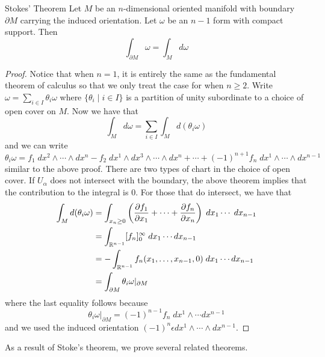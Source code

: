 \documentclass[a4paper]{article}
\begin{document}
\begin{thm}{Stokes' Theorem}{} Let $M$ be an $n$-dimensional oriented manifold with boundary $\partial M$ carrying the induced orientation. Let $\omega$ be an $n-1$ form with compact support. Then $$\int_{\partial M}\omega=\int_Md\omega$$ \tcbline
\begin{proof}
Notice that when $n=1$, it is entirely the same as the fundamental theorem of calculus so that we only treat the case for when $n\geq 2$. Write $\omega=\sum_{i\in I}\theta_i\omega$ where $\{\theta_i\;|\;i\in I\}$ is a partition of unity subordinate to a choice of open cover on $M$. Now we have that $$\int_Md\omega=\sum_{i\in I}\int_Md(\theta_i\omega)$$ and we can write $$\theta_i\omega=f_1\;dx^2\wedge\cdots\wedge dx^n-f_2\;dx^1\wedge dx^3\wedge\cdots\wedge dx^n+\cdots+(-1)^{n+1}f_n\;dx^1\wedge\cdots\wedge dx^{n-1}$$ similar to the above proof. There are two types of chart in the choice of open cover. If $U_\alpha$ does not intersect with the boundary, the above theorem implies that the contribution to the integral is $0$. For those that do intersect, we have that 
\begin{align*}
\int_Md(\theta_i\omega)&=\int_{x_n\geq 0}\left(\frac{\partial f_1}{\partial x_1}+\cdots+\frac{\partial f_n}{\partial x_n}\right)\;dx_1\cdots\;dx_{n-1}\\
&=\int_{\mathbb{R}^{n-1}}[f_n]_0^\infty\;dx_1\cdots dx_{n-1}\\
&=-\int_{\mathbb{R}^{n-1}}f_n(x_1,\dots,x_{n-1},0)\;dx_1\cdots dx_{n-1}\\
&=\int_{\partial M}\theta_i\omega|_{\partial M}
\end{align*}
where the last equality follows because $$\theta_i\omega|_{\partial M}=(-1)^{n-1}f_n\;dx^1\wedge\cdots dx^{n-1}$$ and we used the induced orientation $(-1)^n\epsilon dx^1\wedge\cdots\wedge dx^{n-1}$. 
\end{proof}
\end{thm}

As a result of Stoke's theorem, we prove several related theorems. 
\end{document}
